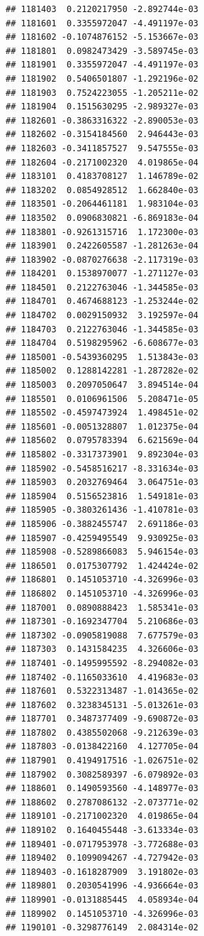 \documentclass[ignorenonframetext,]{beamer}
\begin{document}
\begin{frame}[fragile]
\begin{verbatim}
## 1181403  0.2120217950 -2.892744e-03
## 1181601  0.3355972047 -4.491197e-03
## 1181602 -0.1074876152 -5.153667e-03
## 1181801  0.0982473429 -3.589745e-03
## 1181901  0.3355972047 -4.491197e-03
## 1181902  0.5406501807 -1.292196e-02
## 1181903  0.7524223055 -1.205211e-02
## 1181904  0.1515630295 -2.989327e-03
## 1182601 -0.3863316322 -2.890053e-03
## 1182602 -0.3154184560  2.946443e-03
## 1182603 -0.3411857527  9.547555e-03
## 1182604 -0.2171002320  4.019865e-04
## 1183101  0.4183708127  1.146789e-02
## 1183202  0.0854928512  1.662840e-03
## 1183501 -0.2064461181  1.983104e-03
## 1183502  0.0906830821 -6.869183e-04
## 1183801 -0.9261315716  1.172300e-03
## 1183901  0.2422605587 -1.281263e-04
## 1183902 -0.0870276638 -2.117319e-03
## 1184201  0.1538970077 -1.271127e-03
## 1184501  0.2122763046 -1.344585e-03
## 1184701  0.4674688123 -1.253244e-02
## 1184702  0.0029150932  3.192597e-04
## 1184703  0.2122763046 -1.344585e-03
## 1184704  0.5198295962 -6.608677e-03
## 1185001 -0.5439360295  1.513843e-03
## 1185002  0.1288142281 -1.287282e-02
## 1185003  0.2097050647  3.894514e-04
## 1185501  0.0106961506  5.208471e-05
## 1185502 -0.4597473924  1.498451e-02
## 1185601 -0.0051328807  1.012375e-04
## 1185602  0.0795783394  6.621569e-04
## 1185802 -0.3317373901  9.892304e-03
## 1185902 -0.5458516217 -8.331634e-03
## 1185903  0.2032769464  3.064751e-03
## 1185904  0.5156523816  1.549181e-03
## 1185905 -0.3803261436 -1.410781e-03
## 1185906 -0.3882455747  2.691186e-03
## 1185907 -0.4259495549  9.930925e-03
## 1185908 -0.5289866083  5.946154e-03
## 1186501  0.0175307792  1.424424e-02
## 1186801  0.1451053710 -4.326996e-03
## 1186802  0.1451053710 -4.326996e-03
## 1187001  0.0890888423  1.585341e-03
## 1187301 -0.1692347704  5.210686e-03
## 1187302 -0.0905819088  7.677579e-03
## 1187303  0.1431584235  4.326606e-03
## 1187401 -0.1495995592 -8.294082e-03
## 1187402 -0.1165033610  4.419683e-03
## 1187601  0.5322313487 -1.014365e-02
## 1187602  0.3238345131 -5.013261e-03
## 1187701  0.3487377409 -9.690872e-03
## 1187802  0.4385502068 -9.212639e-03
## 1187803 -0.0138422160  4.127705e-04
## 1187901  0.4194917516 -1.026751e-02
## 1187902  0.3082589397 -6.079892e-03
## 1188601  0.1490593560 -4.148977e-03
## 1188602  0.2787086132 -2.073771e-02
## 1189101 -0.2171002320  4.019865e-04
## 1189102  0.1640455448 -3.613334e-03
## 1189401 -0.0717953978 -3.772688e-03
## 1189402  0.1099094267 -4.727942e-03
## 1189403 -0.1618287909  3.191802e-03
## 1189801  0.2030541996 -4.936664e-03
## 1189901 -0.0131885445  4.058934e-04
## 1189902  0.1451053710 -4.326996e-03
## 1190101 -0.3298776149  2.084314e-02

\end{verbatim}
\end{frame}
\end{document}
